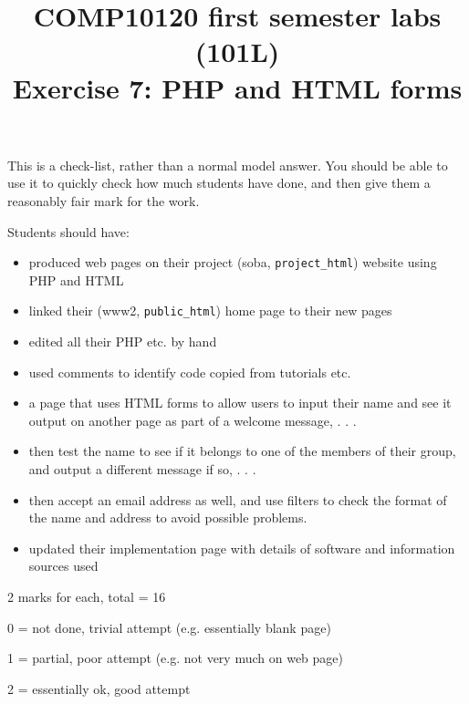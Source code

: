 \documentclass[12pt]{article}
\title{COMP10120 first semester labs (101L) \\
       Exercise 7: PHP and HTML forms}
\author{}
\date{}
\begin{document}
\maketitle

This is a check-list, rather than a normal model answer. You should
be able to use it to quickly check how much students have done, and
then give them a reasonably fair mark for the work.

Students should have:

\begin{itemize}
\item produced web pages on their project (soba, \verb!project_html!) website
  using PHP and HTML

\item linked their (www2, \verb!public_html!) home page to their new pages

\item edited all their PHP etc. by hand

\item used comments to identify code copied from tutorials etc.

\item a page that uses HTML forms to allow users to input their name and
  see it output on another page as part of a welcome message, . . .

\item then test the name to see if it belongs to one of the members of
  their group, and output a different message if so, . . .

\item then accept an email address as well, and use filters to check the
  format of the name and address to avoid possible problems.

\item updated their implementation page with details of software and
  information sources used
\end{itemize}

2 marks for each, total = 16

 0 = not done, trivial attempt (e.g. essentially blank page)

 1 = partial, poor attempt (e.g. not very much on web page)

 2 = essentially ok, good attempt
\end{document}
